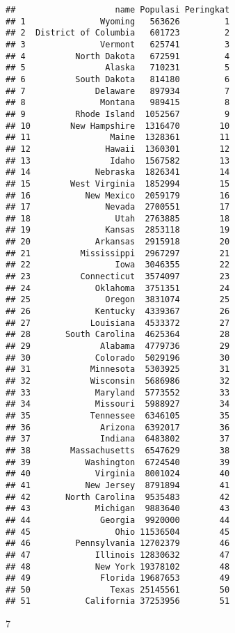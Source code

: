 \documentclass[
]{article}
\newenvironment{Shaded}{\begin{snugshade}}{\end{snugshade}}
\newcommand{\KeywordTok}[1]{\textcolor[rgb]{0.13,0.29,0.53}{\textbf{#1}}}
\newcommand{\NormalTok}[1]{#1}
\newcommand{\OperatorTok}[1]{\textcolor[rgb]{0.81,0.36,0.00}{\textbf{#1}}}
\newcommand{\StringTok}[1]{\textcolor[rgb]{0.31,0.60,0.02}{#1}}
\begin{document}
\begin{verbatim}
##                    name Populasi Peringkat
## 1               Wyoming   563626         1
## 2  District of Columbia   601723         2
## 3               Vermont   625741         3
## 4          North Dakota   672591         4
## 5                Alaska   710231         5
## 6          South Dakota   814180         6
## 7              Delaware   897934         7
## 8               Montana   989415         8
## 9          Rhode Island  1052567         9
## 10        New Hampshire  1316470        10
## 11                Maine  1328361        11
## 12               Hawaii  1360301        12
## 13                Idaho  1567582        13
## 14             Nebraska  1826341        14
## 15        West Virginia  1852994        15
## 16           New Mexico  2059179        16
## 17               Nevada  2700551        17
## 18                 Utah  2763885        18
## 19               Kansas  2853118        19
## 20             Arkansas  2915918        20
## 21          Mississippi  2967297        21
## 22                 Iowa  3046355        22
## 23          Connecticut  3574097        23
## 24             Oklahoma  3751351        24
## 25               Oregon  3831074        25
## 26             Kentucky  4339367        26
## 27            Louisiana  4533372        27
## 28       South Carolina  4625364        28
## 29              Alabama  4779736        29
## 30             Colorado  5029196        30
## 31            Minnesota  5303925        31
## 32            Wisconsin  5686986        32
## 33             Maryland  5773552        33
## 34             Missouri  5988927        34
## 35            Tennessee  6346105        35
## 36              Arizona  6392017        36
## 37              Indiana  6483802        37
## 38        Massachusetts  6547629        38
## 39           Washington  6724540        39
## 40             Virginia  8001024        40
## 41           New Jersey  8791894        41
## 42       North Carolina  9535483        42
## 43             Michigan  9883640        43
## 44              Georgia  9920000        44
## 45                 Ohio 11536504        45
## 46         Pennsylvania 12702379        46
## 47             Illinois 12830632        47
## 48             New York 19378102        48
## 49              Florida 19687653        49
## 50                Texas 25145561        50
## 51           California 37253956        51
\end{verbatim}

7

\begin{Shaded}
\end{Shaded}
\end{document}
